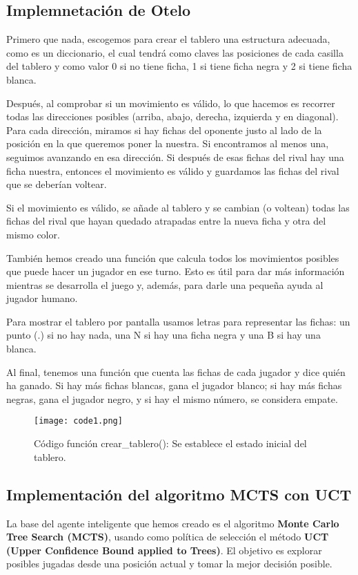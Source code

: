 \documentclass[conference]{IEEEtran}
\begin{document}
\subsection{Implemnetación de Otelo}
Primero que nada, escogemos para crear el tablero una estructura adecuada, como es un diccionario, el cual tendrá como claves las posiciones de cada casilla del tablero y como valor 0 si no tiene ficha, 1 si tiene ficha negra y 2 si tiene ficha blanca.

Después, al comprobar si un movimiento es válido, lo que hacemos es recorrer todas las direcciones posibles (arriba, abajo, derecha, izquierda y en diagonal). Para cada dirección, miramos si hay fichas del oponente justo al lado de la posición en la que queremos poner la nuestra. Si encontramos al menos una, seguimos avanzando en esa dirección. Si después de esas fichas del rival hay una ficha nuestra, entonces el movimiento es válido y guardamos las fichas del rival que se deberían voltear.

Si el movimiento es válido, se añade al tablero y se cambian (o voltean) todas las fichas del rival que hayan quedado atrapadas entre la nueva ficha y otra del mismo color.

También hemos creado una función que calcula todos los movimientos posibles que puede hacer un jugador en ese turno. Esto es útil para dar más información mientras se desarrolla el juego y, además, para darle una pequeña ayuda al jugador humano.

Para mostrar el tablero por pantalla usamos letras para representar las fichas: un punto (.) si no hay nada, una N si hay una ficha negra y una B si hay una blanca.

Al final, tenemos una función que cuenta las fichas de cada jugador y dice quién ha ganado. Si hay más fichas blancas, gana el jugador blanco; si hay más fichas negras, gana el jugador negro, y si hay el mismo número, se considera empate.

\begin{figure}[htbp]
    \centerline{\texttt{[image: code1.png]}}
    \caption{Código función crear\_tablero(): Se establece el estado inicial del tablero.}
    \label{código}
\end{figure}

\subsection{Implementación del algoritmo MCTS con UCT}
La base del agente inteligente que hemos creado es el algoritmo \textbf{Monte Carlo Tree Search (MCTS)}, usando como política de selección el método \textbf{UCT (Upper Confidence Bound applied to Trees)}. El objetivo es explorar posibles jugadas desde una posición actual y tomar la mejor decisión posible.
\end{document}
